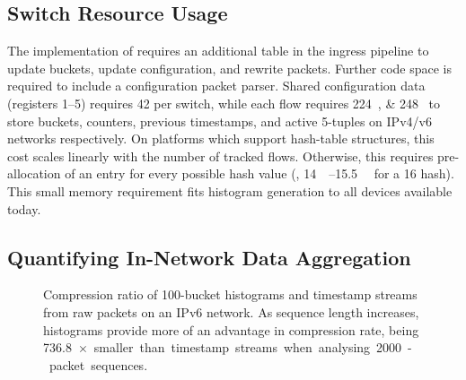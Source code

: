 \subsection{Switch Resource Usage}
The implementation of \seidr{} requires an additional table in the ingress pipeline to update buckets, update configuration, and rewrite packets.
Further code space is required to include a configuration packet parser.
Shared configuration data (registers \numrange{1}{5}) requires \SI{42}{\byte} per switch, while each flow requires \SIlist{224;248}{\byte} to store buckets, counters, previous timestamps, and active 5-tuples on IPv4/v6 networks respectively.
On platforms which support hash-table structures, this cost scales linearly with the number of tracked flows.
Otherwise, this requires pre-allocation of an entry for every possible hash value (\eg, \SIrange{14}{15.5}{\mebi\byte} for a \SI{16}{\bit} hash). This small memory requirement fits histogram generation to all devices available today.

\subsection{Quantifying In-Network Data Aggregation}

\begin{figure}
    \centering
    \vspace{-0.35cm}
    \caption{Compression ratio of \num{100}-bucket histograms and timestamp streams from raw packets on an IPv6 network. As sequence length increases, histograms provide more of an advantage in compression rate, being \SI{736.8}{$\times$} smaller than timestamp streams when analysing \num{2000}-packet sequences.}
    \label{fig:histo-compression}
    \vspace{-0.65cm}
\end{figure}

